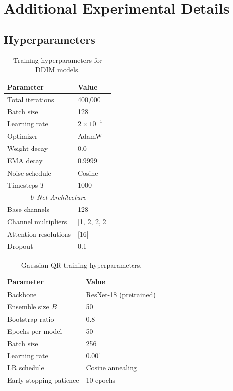 \documentclass{article}
\begin{document}
\appendix
\onecolumn

\section{Additional Experimental Details}
\label{app:details}

\subsection{Hyperparameters}

\begin{table}[h]
\caption{Training hyperparameters for DDIM models.}
\begin{center}
\begin{tabular}{ll}
\toprule
Parameter & Value \\
\midrule
Total iterations & 400,000 \\
Batch size & 128 \\
Learning rate & $2 \times 10^{-4}$ \\
Optimizer & AdamW \\
Weight decay & 0.0 \\
EMA decay & 0.9999 \\
Noise schedule & Cosine \\
Timesteps $T$ & 1000 \\
\midrule
\multicolumn{2}{c}{\textit{U-Net Architecture}} \\
Base channels & 128 \\
Channel multipliers & [1, 2, 2, 2] \\
Attention resolutions & [16] \\
Dropout & 0.1 \\
\bottomrule
\end{tabular}
\end{center}
\end{table}

\begin{table}[h]
\caption{Gaussian QR training hyperparameters.}
\begin{center}
\begin{tabular}{ll}
\toprule
Parameter & Value \\
\midrule
Backbone & ResNet-18 (pretrained) \\
Ensemble size $B$ & 50 \\
Bootstrap ratio & 0.8 \\
Epochs per model & 50 \\
Batch size & 256 \\
Learning rate & 0.001 \\
LR schedule & Cosine annealing \\
Early stopping patience & 10 epochs \\
\bottomrule
\end{tabular}
\end{center}
\end{table}
\end{document}
